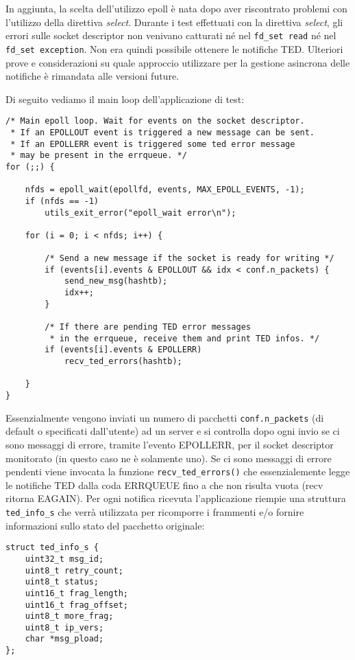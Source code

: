 \documentclass[a4paper,10pt]{article}
\begin{document}
In aggiunta, la scelta dell'utilizzo epoll è nata dopo aver riscontrato
problemi con l'utilizzo della direttiva \emph{select}. 
Durante i test effettuati con la direttiva
\emph{select}, gli errori sulle socket descriptor non
venivano catturati né nel \texttt{fd\_set read} né nel \texttt{fd\_set
exception}. Non era quindi possibile ottenere le notifiche TED.
Ulteriori prove e considerazioni su quale approccio utilizzare per la
gestione asincrona delle notifiche è rimandata alle versioni future.

Di seguito vediamo il main loop dell'applicazione di test:
\begin{lstlisting}
/* Main epoll loop. Wait for events on the socket descriptor.
 * If an EPOLLOUT event is triggered a new message can be sent.
 * If an EPOLLERR event is triggered some ted error message 
 * may be present in the errqueue. */
for (;;) {

	nfds = epoll_wait(epollfd, events, MAX_EPOLL_EVENTS, -1);
	if (nfds == -1)
		utils_exit_error("epoll_wait error\n");
	
	for (i = 0; i < nfds; i++) {

		/* Send a new message if the socket is ready for writing */
		if (events[i].events & EPOLLOUT && idx < conf.n_packets) {
			send_new_msg(hashtb);
			idx++;
		}

		/* If there are pending TED error messages 
		 * in the errqueue, receive them and print TED infos. */
		if (events[i].events & EPOLLERR)
			recv_ted_errors(hashtb);

	}
}

\end{lstlisting}

Essenzialmente vengono inviati un numero di pacchetti
\texttt{conf.n\_packets}
(di default o specificati dall'utente) ad un server e si controlla dopo
ogni invio se ci sono messaggi di errore, tramite l'evento EPOLLERR, per
il socket descriptor monitorato (in questo caso ne è solamente uno).
Se ci sono messaggi di errore pendenti viene invocata la funzione 
\texttt{recv\_ted\_errors()} che essenzialemente legge le notifiche TED 
dalla coda ERRQUEUE fino a che non risulta vuota (recv ritorna EAGAIN).
Per ogni notifica ricevuta l'applicazione riempie una struttura
\texttt{ted\_info\_s} che verrà utilizzata per ricomporre i frammenti
e/o fornire informazioni
sullo stato del pacchetto originale:
\begin{lstlisting}
struct ted_info_s {
	uint32_t msg_id;
	uint8_t retry_count;
	uint8_t status;
	uint16_t frag_length;
	uint16_t frag_offset;
	uint8_t more_frag;
	uint8_t ip_vers;
	char *msg_pload;
};
\end{lstlisting}
\end{document}
